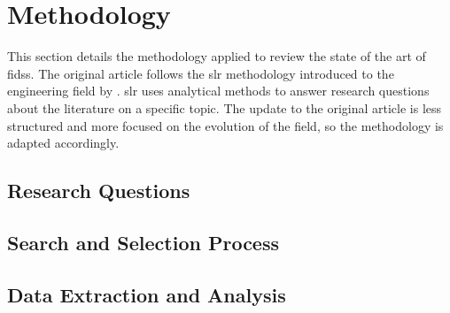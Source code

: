 \section{Methodology\label{sec:sota.methodo}}

This section details the methodology applied to review the state of the art of \glspl{fids}.
The original article follows the \gls{slr} methodology introduced to the engineering field by \textcite{kitchenham_Guidelinesperformingsystematic_2007}.
\Gls{slr} uses analytical methods to answer research questions about the literature on a specific topic.
The update to the original article is less structured and more focused on the evolution of the field, so the methodology is adapted accordingly.

\subsection{Research Questions\label{sec:sota.methodo.questions}}

\subsection{Search and Selection Process\label{sec:sota.methodo.search}}

\subsection{Data Extraction and Analysis\label{sec:sota.methodo.extraction}}


